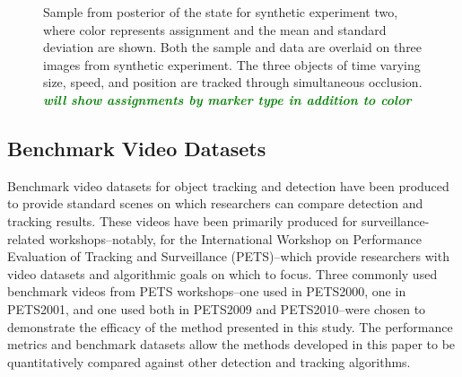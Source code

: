 \documentclass[smallcondensed, final]{svjour3}
\newcommand{\willie}[1]{\textcolor{green}{\textsf{\emph{\textbf{\textcolor{green}{#1}}}}}}
\begin{document}
\begin{figure}[h]
        \caption{\label{fig:synth2_alphaimg} Sample from posterior of the state for synthetic experiment two, where color represents assignment and the mean and standard deviation are shown. Both the sample and data are overlaid on three images from synthetic experiment. The three objects of time varying size, speed, and position are tracked through simultaneous occlusion.  \willie{will show assignments by marker type in addition to color}}
\end{figure}





\subsection{Benchmark Video Datasets}

Benchmark video datasets for object tracking and detection have been produced to provide standard scenes on which researchers can compare detection and tracking results. These videos have been primarily produced for surveillance-related workshops--notably, for the International Workshop on Performance Evaluation of Tracking and Surveillance (PETS)--which provide researchers with video datasets and algorithmic goals on which to focus. Three commonly used benchmark videos from PETS workshops--one used in PETS2000, one in PETS2001, and one used both in PETS2009 and PETS2010--were chosen to demonstrate the efficacy of the method presented in this study. The performance metrics and benchmark datasets allow the methods developed in this paper to be quantitatively compared against other detection and tracking algorithms.
\end{document}
